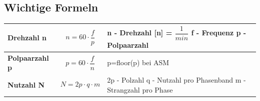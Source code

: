 \subsection{Wichtige Formeln}
\renewcommand{\arraystretch}{0.8}
\begin{tabular}{|C{0.3\textwidth}|P{0.3\textwidth}|P{0.3\textwidth}|}
    \hline
    \textbf{Drehzahl n} &
    \[n = 60\cdot \dfrac{f}{p}\] &
    \vspace{0.1cm}n - Drehzahl [n] = $\dfrac{1}{min}$ \newline 
    f - Frequenz \newline
    p - Polpaarzahl 
    \\ \hline
    \textbf{Polpaarzahl p}&
    \[ p= 60\cdot \dfrac{f}{n} \]&
    p=floor(p) bei ASM
    \\ \hline 
    \textbf{Nutzahl N} &
    \[ N = 2p\cdot q\cdot m\] &
    2p - Polzahl \newline 
    q - Nutzahl pro Phasenband \newline
    m - Strangzahl pro Phase 
    \\ \hline  						 
\end{tabular}
\clearpage